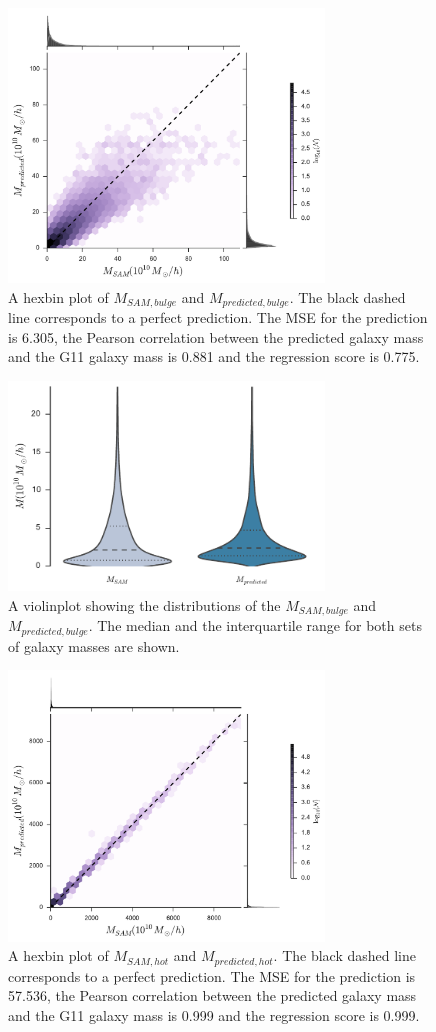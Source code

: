 \documentclass[a4paper,fleqn,usenatbib]{mnras}
\begin{document}
\begin{figure}
\includegraphics[width=84mm]{fig4.pdf}
\caption{A hexbin plot of $M_{SAM,bulge}$ and $M_{predicted,bulge}$. The black dashed line corresponds to a perfect prediction. The MSE for the prediction is 6.305, the Pearson correlation between the predicted galaxy mass and the G11 galaxy mass is 0.881 and the regression score is 0.775.}
\label{bulge1}
\end{figure}

\begin{figure}
  \includegraphics[width=84mm]{fig5.pdf}
  \caption{A violinplot showing the distributions of the $M_{SAM,bulge}$ and $M_{predicted,bulge}$. The median and the interquartile range for both sets of galaxy masses are shown. }
\label{bulge2}
\end{figure}


\begin{figure}
\includegraphics[width=84mm]{fig6.pdf}
\caption{A hexbin plot of $M_{SAM,hot}$ and $M_{predicted,hot}$. The black dashed line corresponds to a perfect prediction. The MSE for the prediction is 57.536, the Pearson correlation between the predicted galaxy mass and the G11 galaxy mass is 0.999 and the regression score is 0.999.}
\label{hot1}
\end{figure}
\end{document}
